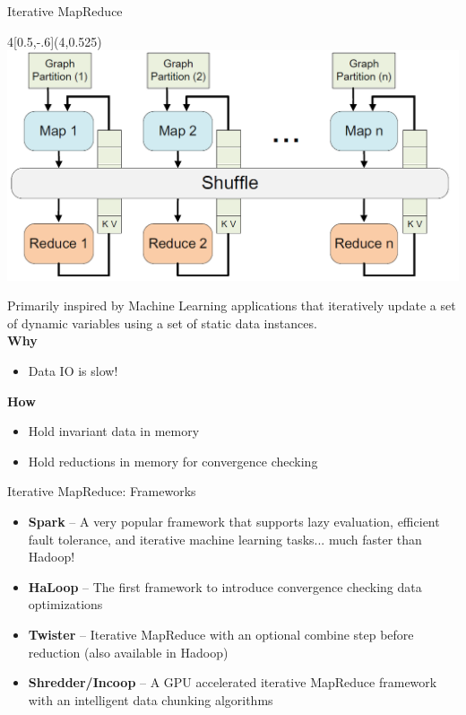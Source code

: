 \documentclass{beamer}
\begin{document}
\begin{frame}{Iterative MapReduce}

\begin{textblock}{4}[0.5,-.6](4,0.525)
\includegraphics[scale=.18]{iterprocess.png}
\end{textblock}

Primarily inspired by Machine Learning applications that iteratively update a set of dynamic variables using a set of static data instances.\\
\vspace{.5cm}
\textbf{Why}
\begin{itemize}
\item Data IO is slow!
\end{itemize}
\textbf{How}
\begin{itemize}
\item Hold invariant data in memory
\item Hold reductions in memory for convergence checking
\end{itemize}

\end{frame}

\begin{frame}{Iterative MapReduce: Frameworks}

\begin{itemize}
\item \textbf{Spark} -- A very popular framework that supports lazy evaluation, efficient fault tolerance, and iterative machine learning tasks... much faster than Hadoop!
\item \textbf{HaLoop} -- The first framework to introduce convergence checking data optimizations
\item \textbf{Twister} -- Iterative MapReduce with an optional combine step before reduction (also available in Hadoop)
\item \textbf{Shredder/Incoop} -- A GPU accelerated iterative MapReduce framework with an intelligent data chunking algorithms
\end{itemize}

\end{frame}
\end{document}
